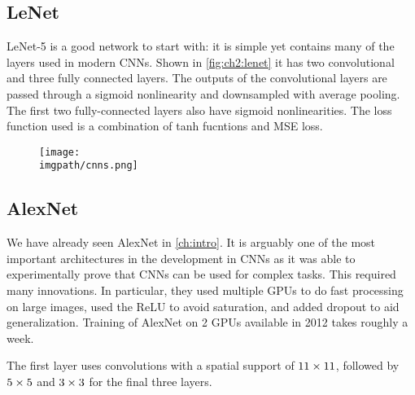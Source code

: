 \subsection{LeNet}
LeNet-5 \cite{lecun_gradient-based_1998} is a good network to start with: it
is simple yet contains many of the layers used in modern CNNs. Shown in
\autoref{fig:ch2:lenet} it has two convolutional and three fully connected
layers. The outputs of the convolutional layers are passed through a sigmoid
nonlinearity and downsampled with average pooling. The first two fully-connected
layers also have sigmoid nonlinearities. The loss function used is a combination
of tanh fucntions and MSE loss.

\begin{figure}
  \centering
  \texttt{[image: \\imgpath/cnns.png]}
  \label{fig:ch2:lenet}
\end{figure}

\subsection{AlexNet}
We have already seen AlexNet \cite{krizhevsky_imagenet_2012} in \autoref{ch:intro}. 
It is arguably one of the most important architectures in the development in CNNs as it 
was able to experimentally prove that CNNs can be used for complex tasks. This
required many innovations. In particular, they used multiple GPUs to do fast
processing on large images, used the ReLU to avoid saturation, and added dropout
to aid generalization. Training of AlexNet on 2 GPUs available in 2012 takes
roughly a week.

The first layer uses convolutions with a spatial support of $11\times11$, followed
by $5\times 5$ and $3\times 3$ for the final three layers.


